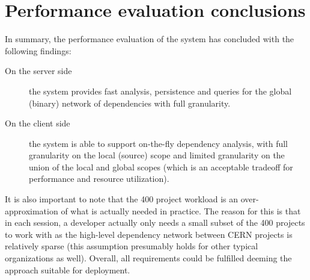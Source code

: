 \section{Performance evaluation conclusions}
In summary, the performance evaluation of the system has concluded with the following findings:
\begin{description}
\item[On the server side] the system provides fast analysis, persistence and
queries for the global (binary) network of dependencies with full granularity.
\item[On the client side] the system is able to support on-the-fly dependency
analysis, with full granularity on the local (source) scope and limited
granularity on the union of the local and global scopes (which is an acceptable
tradeoff for performance and resource utilization).
\end{description}

It is also important to note that the 400 project workload is an
over-approximation of what is actually needed in practice. The reason for this
is that in each session, a developer actually only needs a small subset of the
400 projects to work with as the high-level dependency network between CERN
projects is relatively sparse (this assumption presumably holds for other
typical organizations as well). Overall, all requirements could be fulfilled
deeming the approach suitable for deployment.

